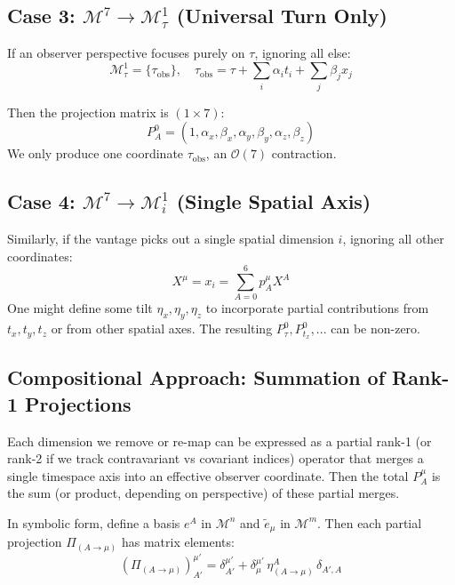\documentclass{article}
\begin{document}
\subsection{Case 3: $\mathcal{M}^7 \to \mathcal{M}^1_{\tau}$ (Universal Turn Only)}

If an observer perspective focuses purely on $\tau$, ignoring all else:
\begin{equation}
\mathcal{M}^1_{\tau} = \{\tau_{\text{obs}}\},\quad \tau_{\text{obs}} = \tau + \sum_{i} \alpha_i t_i + \sum_{j} \beta_j x_j
\end{equation}

Then the projection matrix is $(1\times7)$:
\begin{equation}
P^{0}_{A} = (1,\alpha_x,\beta_x,\alpha_y,\beta_y,\alpha_z,\beta_z)
\end{equation}
We only produce one coordinate $\tau_{\text{obs}}$, an $\mathcal{O}(7)$ contraction.

\subsection{Case 4: $\mathcal{M}^7 \to \mathcal{M}^1_{i}$ (Single Spatial Axis)}

Similarly, if the vantage picks out a single spatial dimension $i$, ignoring all other coordinates:
\begin{equation}
X^\mu = x_i = \sum_{A=0}^{6} p^\mu_A X^A
\end{equation}
One might define some tilt $\eta_x,\eta_y,\eta_z$ to incorporate partial contributions from $t_x,t_y,t_z$ or from other spatial axes. The resulting $P^{0}_{\tau}, P^{0}_{t_x}, ...$ can be non-zero.

\subsection{Compositional Approach: Summation of Rank-1 Projections}
\label{sec:RankOneSum}

Each dimension we remove or re-map can be expressed as a partial rank-1 (or rank-2 if we track contravariant vs covariant indices) operator that merges a single timespace axis into an effective observer coordinate. Then the total $P^{\mu}_{A}$ is the sum (or product, depending on perspective) of these partial merges.

In symbolic form, define a basis $e^A$ in $\mathcal{M}^n$ and $\tilde{e}_\mu$ in $\mathcal{M}^m$. Then each partial projection $\Pi_{(A\to\mu)}$ has matrix elements:
\begin{equation}
(\Pi_{(A\to\mu)})^{\mu'}_{A'} = \delta^{\mu'}_{A'} + \delta^{\mu'}_\mu\,\eta^A_{(A\to\mu)}\,\delta_{A',A}
\end{equation}
\end{document}
